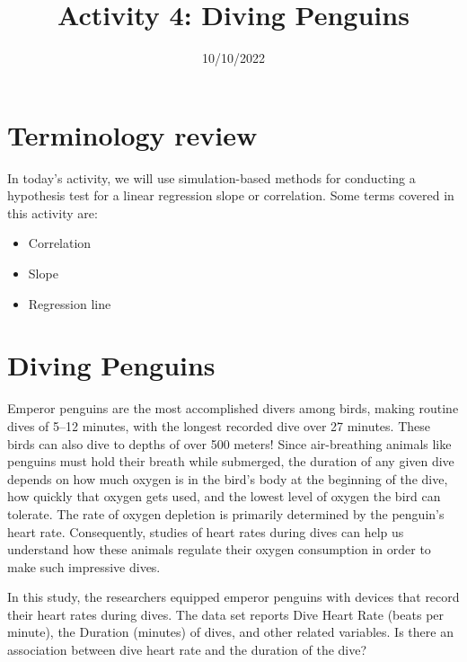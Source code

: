 \documentclass[
  letterpaper,
  DIV=11,
  numbers=noendperiod]{scrartcl}
\title{Activity 4: Diving Penguins}
\author{}
\date{10/10/2022}
\providecommand{\tightlist}{%
  \setlength{\itemsep}{0pt}\setlength{\parskip}{0pt}}\usepackage{longtable,booktabs,array}
\begin{document}
\maketitle
\ifdefined\Shaded\renewenvironment{Shaded}{\begin{tcolorbox}[enhanced, borderline west={3pt}{0pt}{shadecolor}, interior hidden, breakable, frame hidden, sharp corners, boxrule=0pt]}{\end{tcolorbox}}\fi

\hypertarget{terminology-review}{%
\section{Terminology review}\label{terminology-review}}

In today's activity, we will use simulation-based methods for conducting
a hypothesis test for a linear regression slope or correlation. Some
terms covered in this activity are:

\begin{itemize}
\tightlist
\item
  Correlation
\item
  Slope
\item
  Regression line
\end{itemize}

\hypertarget{diving-penguins}{%
\section{Diving Penguins}\label{diving-penguins}}

Emperor penguins are the most accomplished divers among birds, making
routine dives of 5--12 minutes, with the longest recorded dive over 27
minutes. These birds can also dive to depths of over 500 meters! Since
air-breathing animals like penguins must hold their breath while
submerged, the duration of any given dive depends on how much oxygen is
in the bird's body at the beginning of the dive, how quickly that oxygen
gets used, and the lowest level of oxygen the bird can tolerate. The
rate of oxygen depletion is primarily determined by the penguin's heart
rate. Consequently, studies of heart rates during dives can help us
understand how these animals regulate their oxygen consumption in order
to make such impressive dives.

In this study, the researchers equipped emperor penguins with devices
that record their heart rates during dives. The data set reports Dive
Heart Rate (beats per minute), the Duration (minutes) of dives, and
other related variables. Is there an association between dive heart rate
and the duration of the dive?
\end{document}
